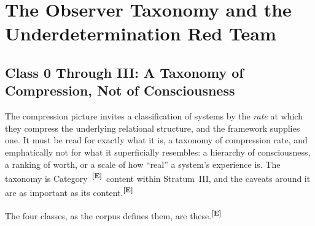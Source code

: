 \documentclass[12pt,a4paper,twoside]{article}
\theoremstyle{plain}
\theoremstyle{definition}
\theoremstyle{remark}
\newcommand{\catmark}[1]{\textsuperscript{\textsf{\textbf{[#1]}}}}
\begin{document}
\section{The Observer Taxonomy and the Underdetermination Red Team}
\label{sec:observer-taxonomy-underdetermination}

\subsection{Class 0 Through III: A Taxonomy of Compression, Not of Consciousness}
\label{subsec:observer-taxonomy}

The compression picture invites a classification of systems by the \emph{rate} at which they compress the underlying relational structure, and the framework supplies one. It must be read for exactly what it is, a taxonomy of compression rate, and emphatically not for what it superficially resembles: a hierarchy of consciousness, a ranking of worth, or a scale of how ``real'' a system's experience is. The taxonomy is Category~\catmark{E}\ content within Stratum~III, and the caveats around it are as important as its content.\catmark{E}

The four classes, as the corpus defines them, are these.\catmark{E}
\end{document}
